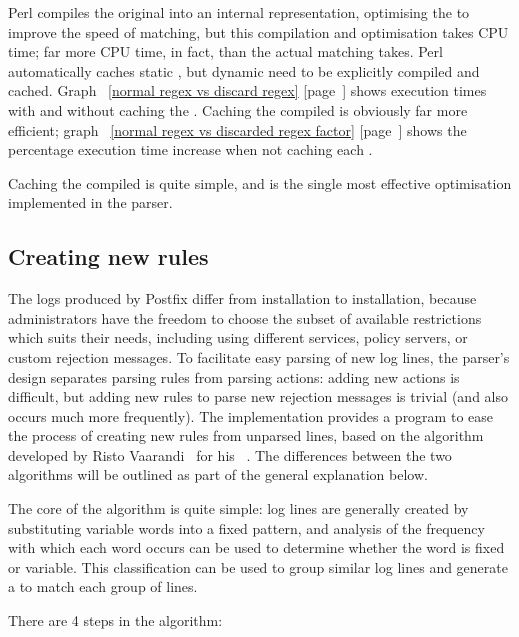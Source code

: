 \documentclass[a4paper,12pt,draft]{article}
\newcommand{\refwithpage}[1]{%
    \empty{}\ref{#1} [page~\pageref{#1}]%
}
\begin{document}
Perl compiles the original \regex{} into an internal representation,
optimising the \regex{} to improve the speed of matching, but this
compilation and optimisation takes CPU time; far more CPU time, in fact,
than the actual matching takes.  Perl automatically caches static
\regexes{}, but dynamic \regexes{} need to be explicitly compiled and
cached.  Graph~\refwithpage{normal regex vs discard regex} shows execution
times with and without caching the \regex{}.  Caching the compiled
\regexes{} is obviously far more efficient; graph~\refwithpage{normal regex
vs discarded regex factor} shows the percentage execution time increase
when not caching each \regex{}.

Caching the compiled \regexes{} is quite simple, and is the single most
effective optimisation implemented in the parser.

\subsection{Creating new rules}

The logs produced by Postfix differ from installation to installation,
because administrators have the freedom to choose the subset of available
restrictions which suits their needs, including using different \RBL{}
services, policy servers, or custom rejection messages.  To facilitate easy
parsing of new log lines, the parser's design separates parsing rules from
parsing actions: adding new actions is difficult, but adding new rules to
parse new rejection messages is trivial (and also occurs much more
frequently).  The implementation provides a program to ease the process of
creating new rules from unparsed lines, based on the algorithm developed by
Risto Vaarandi~\cite{risto-vaarandi} for his \SLCT{}~\cite{slct-paper}.
The differences between the two algorithms will be outlined as part of the
general explanation below.

The core of the algorithm is quite simple: log lines are generally created
by substituting variable words into a fixed pattern, and analysis of the
frequency with which each word occurs can be used to determine whether the
word is fixed or variable.  This classification can be used to group
similar log lines and generate a \regex{} to match each group of lines.

There are 4 steps in the algorithm:
\end{document}
